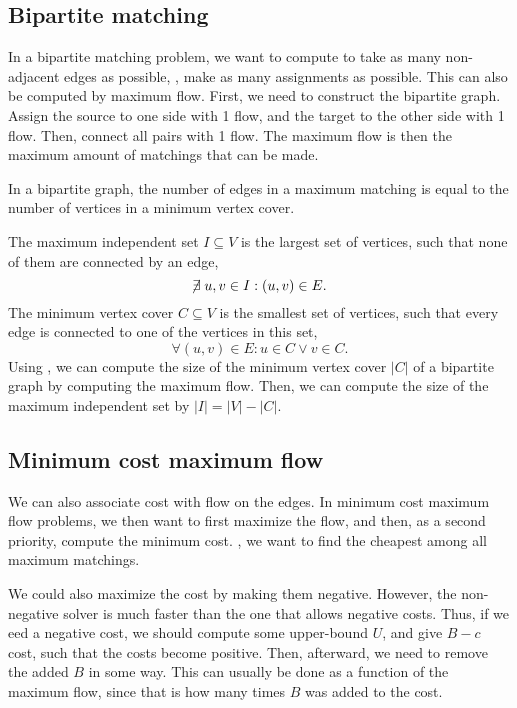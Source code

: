 \documentclass[justified,nobib]{tufte-handout}
\begin{document}
\subsection{Bipartite matching}

In a bipartite matching problem, we want to compute to take as many
non-adjacent edges as possible, \ie, make as many assignments as possible. This
can also be computed by maximum flow. First, we need to construct the bipartite
graph. Assign the source to one side with 1 flow, and the target to the other
side with 1 flow. Then, connect all pairs with 1 flow. The maximum flow is then
the maximum amount of matchings that can be made.

\begin{theorem}[K\"onig]
  \label{thm:konig}

  In a bipartite graph, the number of edges in a maximum matching is equal to
  the number of vertices in a minimum vertex cover.
\end{theorem}

The maximum independent set $I\subseteq V$ is the largest set of vertices, such
that none of them are connected by an edge, \[
  \centernot \exists u,v\in I : (u,v) \in E
.\]
The minimum vertex cover $C \subseteq V$ is the smallest set of vertices, such
that every edge is connected to one of the vertices in this set, \[
  \forall (u,v) \in E : u \in C \lor v \in C
.\]
Using , we can compute the size of the minimum vertex cover
$|C|$ of a bipartite graph by computing the maximum flow. Then, we can compute
the size of the maximum independent set by $|I| = |V| - |C|$.

\subsection{Minimum cost maximum flow}


We can also associate cost with flow on the edges. In minimum cost maximum flow
problems, we then want to first maximize the flow, and then, as a second
priority, compute the minimum cost. \Ie, we want to find the cheapest among
all maximum matchings.

We could also maximize the cost by making them negative. However, the
non-negative solver is much faster than the one that allows negative costs.
Thus, if we eed a negative cost, we should compute some upper-bound $U$, and
give $B-c$ cost, such that the costs become positive. Then, afterward, we need
to remove the added $B$ in some way. This can usually be done as a function of
the maximum flow, since that is how many times $B$ was added to the cost.
\end{document}

